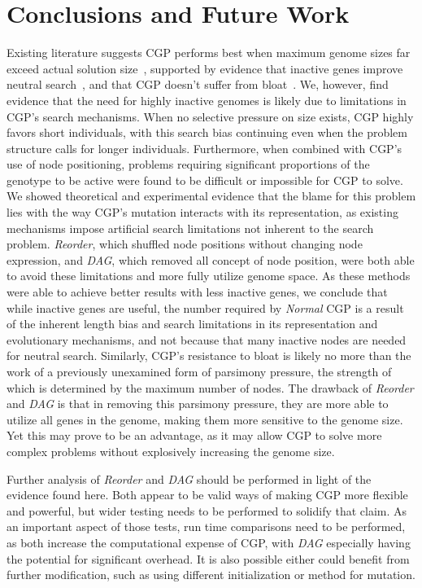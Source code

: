 \documentclass{sig-alternate}
\begin{document}
\section{Conclusions and Future Work}
\label{sec-conclusion}
Existing literature suggests CGP performs best when maximum genome sizes
far exceed actual solution size~\cite{miller:2006:redundancy}, supported by
evidence that inactive genes improve neutral search~\cite{yu:2001:neutrality},
and that CGP doesn't suffer from bloat~\cite{miller:2001:bloat}.  We, however, find evidence
that the need for highly inactive genomes is likely due to limitations in CGP's
search mechanisms.  When no selective pressure on size exists, CGP highly favors
short individuals, with this search bias continuing even when the problem structure
calls for longer individuals.  Furthermore, when combined with CGP's use of node
positioning, problems requiring significant proportions of the genotype to be
active were found to be difficult or impossible for CGP to solve.  We showed theoretical
and experimental evidence that the blame for this problem lies with the way CGP's mutation
interacts with its representation, as existing mechanisms impose artificial search limitations
not inherent to the search problem.  \emph{Reorder}, which shuffled node positions
without changing node expression, and \emph{DAG}, which removed all concept of node
position, were both able to avoid these limitations and more fully utilize
genome space.  As these methods were able to achieve better results with less
inactive genes, we conclude that while inactive genes are useful, the number required
by \emph{Normal} CGP is a result of the inherent length bias and search limitations in its
representation and evolutionary mechanisms, and not because that many inactive
nodes are needed for neutral search.  Similarly, CGP's resistance to bloat is likely
no more than the work of a previously unexamined form of parsimony pressure, the strength
of which is determined by the maximum number of nodes.  The drawback of \emph{Reorder} and
\emph{DAG} is that in removing this parsimony pressure, they are more able to utilize
all genes in the genome, making them more sensitive to the genome size.  Yet this
may prove to be an advantage, as it may allow CGP to solve more complex problems without
explosively increasing the genome size.

Further analysis of \emph{Reorder} and \emph{DAG} should be performed in light
of the evidence found here.  Both appear to be valid ways of making CGP more flexible
and powerful, but wider testing needs to be performed to solidify that claim.  As
an important aspect of those tests, run time comparisons need to be performed, as
both increase the computational expense of CGP, with \emph{DAG} especially having
the potential for significant overhead.  It is also possible either could benefit
from further modification, such as using different initialization or method for mutation.
\end{document}
